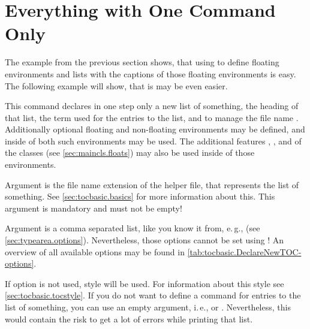 \section{Everything with One Command Only}
\label{sec:tocbasic.highlevel}

The example from the previous section shows, that using  to
define floating environments and lists with the captions of those floating
environments is easy. The following example will show, that is may be even
easier.

\begin{Declaration}
\end{Declaration}
%
This command
declares in one step only a new list of
something, the heading of that list, the term used for the entries to the
list, and to manage the file name . Additionally optional
floating and non-floating environments may be defined, and inside of both such
environments  may
be used. The additional features , , and 
of the \KOMAScript{} classes
(see \autoref{sec:maincls.floats})
may also be used inside of those environments.

Argument  is the file name extension of the helper file, that
represents the list of something. See \autoref{sec:tocbasic.basics} for more
information about this. This argument is mandatory and must not be empty!

Argument  is a comma separated list, like you know it from,
e.\,g.,  (see
\autoref{sec:typearea.options}). Nevertheless, those
options cannot be set using ! An
overview of all available options may be found in
\autoref{tab:tocbasic.DeclareNewTOC-options}.

If option 
is not used, style  will be used. For information about this
style see \autoref{sec:tocbasic.tocstyle}. If you do not want to define a
command for entries to the list of something, you can use an empty argument,
i.\,e.,  or
. Nevertheless, this would contain
the risk to get a lot of errors while printing that list.

